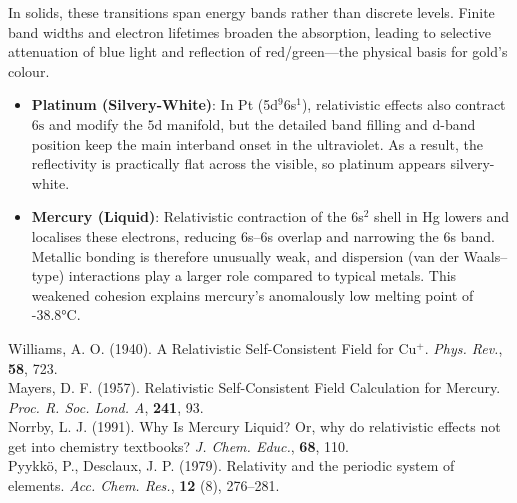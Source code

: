 \begin{technical}
    In solids, these transitions span energy bands rather than discrete levels. Finite band widths and electron lifetimes broaden the absorption, leading to selective attenuation of blue light and reflection of red/green—the physical basis for gold’s colour.
    
    
    \begin{itemize}[leftmargin=*]
    \item \textbf{Platinum (Silvery-White)}: In Pt (5d$^9$6s$^1$), relativistic effects also contract $6\mathrm{s}$ and modify the $5\mathrm{d}$ manifold, but the detailed band filling and $\mathrm{d}$-band position keep the main interband onset in the ultraviolet. As a result, the reflectivity is practically flat across the visible, so platinum appears silvery-white.
    
    \item \textbf{Mercury (Liquid)}: Relativistic contraction of the 6s$^2$ shell in Hg lowers and localises these electrons, reducing 6s–6s overlap and narrowing the 6s band. Metallic bonding is therefore unusually weak, and dispersion (van der Waals–type) interactions play a larger role compared to typical metals. This weakened cohesion explains mercury's anomalously low melting point of -38.8°C.
    \end{itemize}
    

\techref
{\footnotesize
Williams, A. O. (1940). A Relativistic Self-Consistent Field for Cu\(^+\). \textit{Phys. Rev.}, \textbf{58}, 723.\\
Mayers, D. F. (1957). Relativistic Self-Consistent Field Calculation for Mercury. \textit{Proc. R. Soc. Lond. A}, \textbf{241}, 93.\\
Norrby, L. J. (1991). Why Is Mercury Liquid? Or, why do relativistic effects not get into chemistry textbooks? \textit{J. Chem. Educ.}, \textbf{68}, 110.\\
Pyykkö, P., Desclaux, J. P. (1979). Relativity and the periodic system of elements. \textit{Acc. Chem. Res.}, \textbf{12} (8), 276–281.
}
\end{technical}
